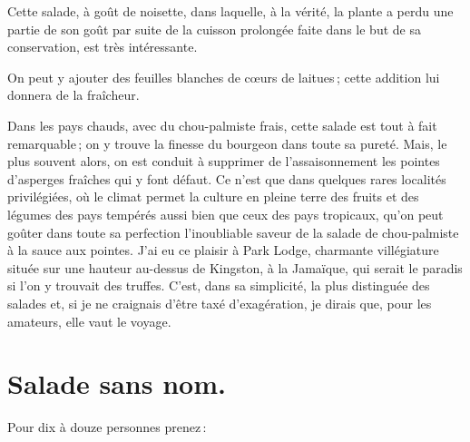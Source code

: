 Cette salade, à goût de noisette, dans laquelle, à la vérité, la plante a perdu
une partie de son goût par suite de la cuisson prolongée faite dans le but de sa
conservation, est très intéressante.

\sk

On peut y ajouter des feuilles blanches de cœurs de laitues ; cette addition
lui donnera de la fraîcheur.

\sk

Dans les pays chauds, avec du chou-palmiste frais, cette salade est tout à fait
remarquable ; on y trouve la finesse du bourgeon dans toute sa pureté. Mais, le
plus souvent alors, on est conduit à supprimer de l'assaisonnement les pointes
d'asperges fraîches qui y font défaut. Ce n'est que dans quelques rares
localités privilégiées, où le climat permet la culture en pleine terre des
fruits et des légumes des pays tempérés aussi bien que ceux des pays tropicaux,
qu'on peut goûter dans toute sa perfection l'inoubliable saveur de la salade de
chou-palmiste à la sauce aux pointes. J'ai eu ce plaisir à Park Lodge,
charmante villégiature située sur une hauteur au-dessus de Kingston, à la
Jamaïque, qui serait le paradis si l’on y trouvait des truffes. C'est, dans sa
simplicité, la plus distinguée des salades et, si je ne craignais d'être taxé
d'exagération, je dirais que, pour les amateurs, elle vaut le voyage.

\section*{\centering Salade sans nom.}
{}

Pour dix à douze personnes prenez :

